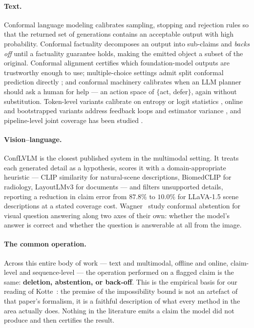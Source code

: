 \documentclass[review,number,doubleblind]{elsarticle}
\theoremstyle{plain}
\theoremstyle{definition}
\theoremstyle{remark}
\begin{document}
\paragraph{Text.}
Conformal language modeling \citep{conformallm} calibrates sampling, stopping and rejection
rules so that the returned set of generations contains an acceptable output with high
probability. Conformal factuality \citep{conformalfactuality} decomposes an output into
sub-claims and \emph{backs off} until a factuality guarantee holds, making the emitted object
a subset of the original. Conformal alignment \citep{gui2024conformal} certifies which
foundation-model outputs are trustworthy enough to use; multiple-choice settings admit split
conformal prediction directly \citep{kumar2023}; and conformal machinery calibrates when an
LLM planner should ask a human for help \citep{ren2023knowno} --- an action space of
$\{$act, defer$\}$, again without substitution. Token-level variants calibrate on entropy or
logit statistics \citep{tecp,cover}, online and bootstrapped variants address feedback loops
and estimator variance \citep{onlineabstention,tamingvar}, and pipeline-level joint coverage
has been studied \citep{pasc}.

\paragraph{Vision--language.}
ConfLVLM \citep{conflvlm} is the closest published system in the multimodal setting. It
treats each generated detail as a hypothesis, scores it with a domain-appropriate heuristic
--- CLIP similarity \citep{clip} for natural-scene descriptions, BiomedCLIP for radiology,
LayoutLMv3 for documents --- and filters unsupported details, reporting a reduction in
claim error from $87.8\%$ to $10.0\%$ for LLaVA-1.5 scene descriptions at a stated
coverage cost. Wagner~\cite{twoaxes} study conformal abstention for visual question answering along
two axes of their own: whether the model's answer is correct and whether the question is
answerable at all from the image.

\paragraph{The common operation.}
Across this entire body of work --- text and multimodal, offline and online, claim-level
and sequence-level --- the operation performed on a flagged claim is the same:
\textbf{deletion, abstention, or back-off}. This is the empirical basis for our reading of
Kotte~\cite{crcimposs}: the premise of the impossibility bound is not an artefact of that
paper's formalism, it is a faithful description of what every method in the area actually
does. Nothing in the literature emits a claim the model did not produce and then certifies
the result.
\end{document}
